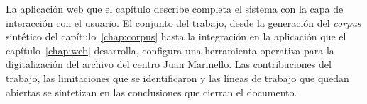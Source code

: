 
La aplicación web que el capítulo describe completa el sistema con la capa de interacción con el usuario. El conjunto del trabajo, desde la generación del \textit{corpus} sintético del capítulo~\ref{chap:corpus} hasta la integración en la aplicación que el capítulo~\ref{chap:web} desarrolla, configura una herramienta operativa para la digitalización del archivo del centro Juan Marinello. Las contribuciones del trabajo, las limitaciones que se identificaron y las líneas de trabajo que quedan abiertas se sintetizan en las conclusiones que cierran el documento.
